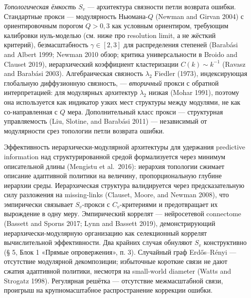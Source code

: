 \documentclass[pdflatex,sn-mathphys-ay]{sn-jnl}
\begin{document}
\emph{Топологическая ёмкость \(S_v\)} --- архитектура связности петли возврата ошибки. Стандартные прокси --- модулярность Ньюмана-\(Q\) (Newman and Girvan 2004) с ориентировочным порогом \(Q > 0{,}3\) как условным ориентиром, требующим калибровки нуль-моделью (см. ниже про resolution limit, а не жёсткий критерий), безмасштабность \(\gamma \in [2, 3]\) для распределения степеней (Barabási and Albert 1999; Newman 2010 обзор; критика универсальности в Broido and Clauset 2019), иерархический коэффициент кластеризации \(C(k) \sim k^{-1}\) (Ravasz and Barabási 2003). Алгебраическая связность \(\lambda_2\) Fiedler (1973), индексирующая глобальную диффузионную связность, --- \emph{вторичный} прокси с обратной интерпретацией: для модулярных архитектур \(\lambda_2\) низкая (Mohar 1991), поэтому она используется как индикатор узких мест структуры между модулями, не как со-направленная с \(Q\) мера. Дополнительный класс прокси --- структурная управляемость (Liu, Slotine, and Barabási 2011) --- независимый от модулярности срез топологии петли возврата ошибки.

Эффективность иерархически-модулярной архитектуры для удержания predictive information над структурированной средой формализуется через минимум описательной длины (Mengistu et al.~2016): иерархия топологии сжимает описание адаптивной политики на величину, пропорциональную глубине иерархии среды. Иерархическая структура валидируется через предсказательную силу разложения на missing-links (Clauset, Moore, and Newman 2008), что эмпирически связывает \(S_v\)-прокси с \(C_v\)-критериями и предотвращает их вырождение в одну меру. Эмпирический коррелят --- нейросетевой connectome (Bassett and Sporns 2017; Lynn and Bassett 2019), демонстрирующий иерархически-модулярную организацию как селекционный коррелят вычислительной эффективности. Два крайних случая обнуляют \(S_v\) конструктивно (§ 5, Блок 1 «Прямые опровержения», п. 3). Случайный граф Erdős--Rényi --- отсутствие модулярной декомпозиции; избыточные короткие связи не дают сжатия адаптивной политики, несмотря на small-world diameter (Watts and Strogatz 1998). Регулярная решётка --- отсутствие межмасштабной связи, проигрыш на крупномасштабное распространение коррекции ошибки.
\end{document}
